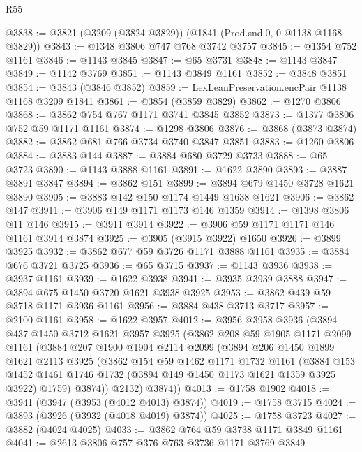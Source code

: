 \begin{lexlean}{R55}
\begin{coremodule}
@3838 := @3821 (@3209 (@3824 @3829)) (@1841 (Prod.snd.{0, 0} @1138 @1168 @3829))
@3843 := @1348 @3806 @747 @768 @3742 @3757
@3845 := @1354 @752 @1161
@3846 := @1143 @3845
@3847 := @65 @3731
@3848 := @1143 @3847
@3849 := @1142 @3769
@3851 := @1143 @3849 @1161
@3852 := @3848 @3851
@3854 := @3843 (@3846 @3852)
@3859 := LexLeanPreservation.encPair @1138 @1168 @3209 @1841
@3861 := @3854 (@3859 @3829)
@3862 := @1270 @3806
@3868 := @3862 @754 @767 @1171 @3741 @3845 @3852
@3873 := @1377 @3806 @752 @59 @1171 @1161
@3874 := @1298 @3806
@3876 := @3868 (@3873 @3874)
@3882 := @3862 @681 @766 @3734 @3740 @3847 @3851
@3883 := @1260 @3806
@3884 := @3883 @144
@3887 := @3884 @680 @3729 @3733
@3888 := @65 @3723
@3890 := @1143 @3888 @1161
@3891 := @1622 @3890
@3893 := @3887 @3891 @3847
@3894 := @3862 @151
@3899 := @3894 @679 @1450 @3728 @1621 @3890
@3905 := @3883 @142 @150 @1174 @1449 @1638 @1621
@3906 := @3862 @147
@3911 := @3906 @149 @1171 @1173 @146 @1359
@3914 := @1398 @3806 @11 @146
@3915 := @3911 @3914
@3922 := @3906 @59 @1171 @1171 @146 @1161 @3914 @3874
@3925 := @3905 (@3915 @3922) @1650
@3926 := @3899 @3925
@3932 := @3862 @677 @59 @3726 @1171 @3888 @1161
@3935 := @3884 @676 @3721 @3725
@3936 := @65 @3715
@3937 := @1143 @3936
@3938 := @3937 @1161
@3939 := @1622 @3938
@3941 := @3935 @3939 @3888
@3947 := @3894 @675 @1450 @3720 @1621 @3938 @3925
@3953 := @3862 @439 @59 @3718 @1171 @3936 @1161
@3956 := @3884 @438 @3713 @3717
@3957 := @2100 @1161
@3958 := @1622 @3957
@4012 := @3956
    @3958
    @3936
    (@3894
      @437
      @1450
      @3712
      @1621
      @3957
      @3925
      (@3862
        @208
        @59
        @1905
        @1171
        @2099
        @1161
        (@3884
          @207
          @1900
          @1904
          @2114
          @2099
          (@3894
            @206
            @1450
            @1899
            @1621
            @2113
            @3925
            (@3862
              @154
              @59
              @1462
              @1171
              @1732
              @1161
              (@3884
                @153
                @1452
                @1461
                @1746
                @1732
                (@3894 @149 @1450 @1173 @1621 @1359 @3925 @3922)
                @1759)
              @3874))
          @2132)
        @3874))
@4013 := @1758 @1902
@4018 := @3941 (@3947 (@3953 (@4012 @4013) @3874))
@4019 := @1758 @3715
@4024 := @3893 (@3926 (@3932 (@4018 @4019) @3874))
@4025 := @1758 @3723
@4027 := @3882 (@4024 @4025)
@4033 := @3862 @764 @59 @3738 @1171 @3849 @1161
@4041 := @2613 @3806 @757 @376 @763 @3736 @1171 @3769 @3849

\end{coremodule}
\end{lexlean}
